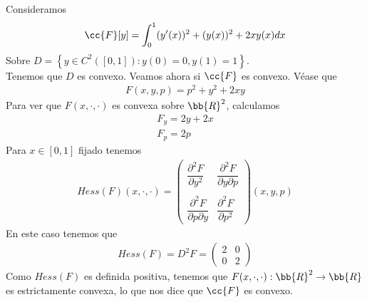 \begin{ejemplo}
    Consideramos 
    \begin{gather*}
        \cc{F}[y] = \int_{0}^{1} (y'(x))^2 + (y(x))^2 + 2xy(x) dx
    \end{gather*}
    Sobre $D = \left\{ y\in C^2([0,1]) : y(0) = 0, y(1) = 1 \right\}$.\\

    Tenemos que $D$ es convexo. Veamos ahora si $\cc{F}$ es convexo. Véase que 
    \begin{gather*}
        F(x,y,p) = p^2 + y^2 + 2xy
    \end{gather*}
    Para ver que $F(x,\cdot, \cdot)$ es convexa sobre $\bb{R}^2$, calculamos
    \begin{gather*}
        F_y = 2y+2x\\
        F_p = 2p
    \end{gather*}
    Para $x\in [0,1]$ fijado tenemos 
    \begin{gather*}
        Hess(F)(x,\cdot,\cdot) = 
        \begin{pmatrix}
            \dfrac{\partial^2F}{\partial y^2} & \dfrac{\partial^2F}{\partial y \partial p}\\\\
            \dfrac{\partial^2F}{\partial p\partial y} & \dfrac{\partial^2F}{\partial p^2}
        \end{pmatrix}(x,y,p)
    \end{gather*}
    En este caso tenemos que 
    \begin{gather*}
        Hess(F) = D^2 F = \begin{pmatrix}
            2 & 0 \\ 
            0 & 2
        \end{pmatrix}
    \end{gather*}
    Como $Hess(F)$ es definida positiva, tenemos que $F(x,\cdot,\cdot):\bb{R}^2 \to \bb{R}$ es estrictamente convexa, lo que nos dice que $\cc{F}$ es convexo. \\


\end{ejemplo}
